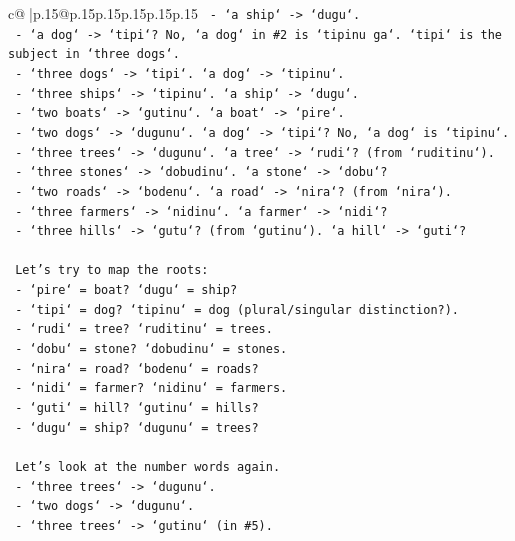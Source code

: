 \documentclass{article}
\begin{document}
{\begin{supertabular}{c@{$\;$}|p{.15\linewidth}@{}p{.15\linewidth}p{.15\linewidth}p{.15\linewidth}p{.15\linewidth}p{.15\linewidth}}
{{{\texttt{   {-} `a ship` {-}> `dugu`.} \\
\texttt{   {-} `a dog` {-}> `tipi`? No, `a dog` in \#2 is `tipinu ga`. `tipi` is the subject in `three dogs`.} \\
\texttt{   {-} `three dogs` {-}> `tipi`. `a dog` {-}> `tipinu`.} \\
\texttt{   {-} `three ships` {-}> `tipinu`. `a ship` {-}> `dugu`.} \\
\texttt{   {-} `two boats` {-}> `gutinu`. `a boat` {-}> `pire`.} \\
\texttt{   {-} `two dogs` {-}> `dugunu`. `a dog` {-}> `tipi`? No, `a dog` is `tipinu`.} \\
\texttt{   {-} `three trees` {-}> `dugunu`. `a tree` {-}> `rudi`? (from `ruditinu`).} \\
\texttt{   {-} `three stones` {-}> `dobudinu`. `a stone` {-}> `dobu`?} \\
\texttt{   {-} `two roads` {-}> `bodenu`. `a road` {-}> `nira`? (from `nira`).} \\
\texttt{   {-} `three farmers` {-}> `nidinu`. `a farmer` {-}> `nidi`?} \\
\texttt{   {-} `three hills` {-}> `gutu`? (from `gutinu`). `a hill` {-}> `guti`?} \\
\\ 
\texttt{   Let's try to map the roots:} \\
\texttt{   {-} `pire` = boat? `dugu` = ship?} \\
\texttt{   {-} `tipi` = dog? `tipinu` = dog (plural/singular distinction?).} \\
\texttt{   {-} `rudi` = tree? `ruditinu` = trees.} \\
\texttt{   {-} `dobu` = stone? `dobudinu` = stones.} \\
\texttt{   {-} `nira` = road? `bodenu` = roads?} \\
\texttt{   {-} `nidi` = farmer? `nidinu` = farmers.} \\
\texttt{   {-} `guti` = hill? `gutinu` = hills?} \\
\texttt{   {-} `dugu` = ship? `dugunu` = trees?} \\
\\ 
\texttt{   Let's look at the number words again.} \\
\texttt{   {-} `three trees` {-}> `dugunu`.} \\
\texttt{   {-} `two dogs` {-}> `dugunu`.} \\
\texttt{   {-} `three trees` {-}> `gutinu` (in \#5).} \\
}}}
\end{supertabular}}
\end{document}
